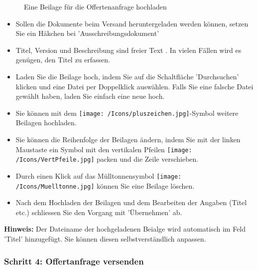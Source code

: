 \begin{figure}[H]
\caption{Eine Beilage für die Offertenanfrage hochladen}
\end{figure}

\begin{itemize}
\item Sollen die Dokumente beim Versand heruntergeladen werden können, setzen Sie ein Häkchen bei 'Ausschreibungsdokument' 
\item Titel, Version und Beschreibung sind freier Text . In vielen Fällen wird es genügen, den Titel zu erfassen.
\item Laden Sie die Beilage hoch, indem Sie auf die Schaltfläche 'Durchsuchen'  klicken und eine Datei per Doppelklick auswählen. Falls Sie
eine falsche Datei gewählt haben, laden Sie einfach eine neue hoch.
\item Sie können mit dem \texttt{[image: /Icons/pluszeichen.jpg]}-Symbol  weitere Beilagen hochladen.
\item Sie können die Reihenfolge der Beilagen ändern, indem Sie mit der linken Maustaste ein Symbol mit den vertikalen Pfeilen \texttt{[image: /Icons/VertPfeile.jpg]}  packen und die Zeile verschieben.
\item Durch einen Klick auf das Mülltonnensymbol \texttt{[image: /Icons/Muelltonne.jpg]}  können Sie eine Beilage löschen.
\item Nach dem Hochladen der Beilagen und dem Bearbeiten der Angaben (Titel etc.) schliessen Sie den Vorgang mit 'Übernehmen'  ab.
\end{itemize}

\textbf{Hinweis:} Der Dateiname der hochgeladenen Beialge wird automatisch im Feld 'Titel' hinzugefügt. Sie können diesen selbstverständlich anpassen.

\subsubsection{Schritt 4: Offertanfrage versenden}

